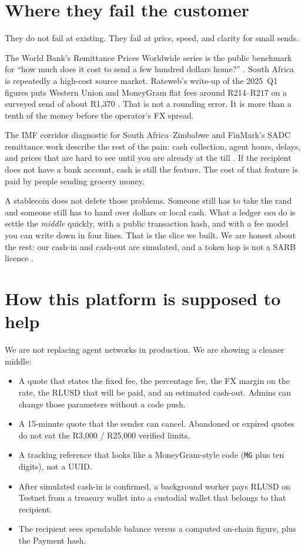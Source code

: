 \documentclass[11pt]{article}
\begin{document}
\section{Where they fail the customer}
They do not fail at existing. They fail at price, speed, and clarity for small sends.

The World Bank's Remittance Prices Worldwide series is the public benchmark for ``how much does it cost to send a few hundred dollars home?'' \citep{WorldBankRPW}. South Africa is repeatedly a high-cost source market. Rateweb's write-up of the 2025~Q1 figures puts Western Union and MoneyGram flat fees around R214--R217 on a surveyed send of about R1{,}370 \citep{Rateweb2026}. That is not a rounding error. It is more than a tenth of the money before the operator's FX spread.

The IMF corridor diagnostic for South Africa--Zimbabwe and FinMark's SADC remittance work describe the rest of the pain: cash collection, agent hours, delays, and prices that are hard to see until you are already at the till \citep{IMF2025SAZim,FinMark2024}. If the recipient does not have a bank account, cash is still the feature. The cost of that feature is paid by people sending grocery money.

A stablecoin does not delete those problems. Someone still has to take the rand and someone still has to hand over dollars or local cash. What a ledger \emph{can} do is settle the \emph{middle} quickly, with a public transaction hash, and with a fee model you can write down in four lines. That is the slice we built. We are honest about the rest: our cash-in and cash-out are simulated, and a token hop is not a SARB licence \citep{UCTBrief2026}.

\section{How this platform is supposed to help}
We are not replacing agent networks in production. We are showing a cleaner middle:

\begin{itemize}
  \item A quote that states the fixed fee, the percentage fee, the FX margin on the rate, the RLUSD that will be paid, and an estimated cash-out. Admins can change those parameters without a code push.
  \item A 15-minute quote that the sender can cancel. Abandoned or expired quotes do not eat the R3{,}000 / R25{,}000 verified limits.
  \item A tracking reference that looks like a MoneyGram-style code (\texttt{MG} plus ten digits), not a UUID.
  \item After simulated cash-in is confirmed, a background worker pays RLUSD on Testnet from a treasury wallet into a custodial wallet that belongs to that recipient.
  \item The recipient sees spendable balance versus a computed on-chain figure, plus the Payment hash.
\end{itemize}
\end{document}
